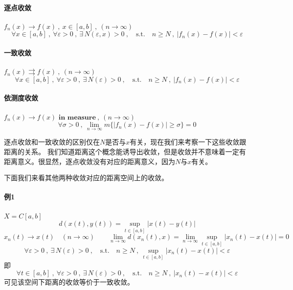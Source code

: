 \paragraph*{逐点收敛} \quad $f_n(x) \rightarrow f(x) \ , \ x \in [a,b] \ , \ (n \rightarrow \infty)$
\[\forall x \in [a,b] \ , \ \forall \varepsilon>0 \ , \ \exists \, N(\varepsilon,x)>0 \ , \quad \text{s.t.} \quad n \geq N \ , \ |f_n(x)-f(x)|<\varepsilon\]

\paragraph*{一致收敛} \quad $f_n(x) \rightrightarrows f(x) \ , \ (n \rightarrow \infty)$
\[\forall x \in [a,b] \ , \ \forall \varepsilon>0 \ , \ \exists \, N(\varepsilon)>0 \ , \quad \text{s.t.} \quad n \geq N \ , \ |f_n(x)-f(x)|<\varepsilon\]

\paragraph*{依测度收敛} \quad $f_n(x) \rightarrow f(x)\textbf{ in measure} \ , \ (n \rightarrow \infty)$
\[\forall \sigma>0 \ , \ \lim_{n \rightarrow \infty}m\{|f_n(x)-f(x)| \geq \sigma\}=0\]

逐点收敛和一致收敛的区别仅在$N$是否与$x$有关，现在我们来考察一下这些收敛跟距离的关系。
我们知道距离这个概念能诱导出收敛，但是收敛并不意味着一定有距离意义。很显然，逐点收敛没有对应的距离意义，因为$N$与$x$有关。

下面我们来看其他两种收敛对应的距离空间上的收敛。

\paragraph*{例1} \quad $X=C[a,b]$
\[d(x(t),y(t))=\mathop {\text{sup}}\limits_{t \in [a,b]}|x(t)-y(t)|\]
\[x_n(t) \rightarrow x(t) \quad (n \rightarrow \infty) \qquad \lim_{n \rightarrow \infty}d(x_n(t),x)=\lim_{n \rightarrow \infty}\mathop {\text{sup}}\limits_{t \in [a,b]}|x_n(t)-x(t)|=0\]
\[\forall \varepsilon>0 \ , \ \exists \, N(\varepsilon)>0 \ , \quad \text{s.t.} \quad n \geq N \ , \ \mathop {\text{sup}}\limits_{t \in [a,b]}|x_n(t)-x(t)|<\varepsilon\]
即
\[\forall t \in [a,b] \ , \ \forall \varepsilon>0 \ , \ \exists \, N(\varepsilon)>0 \ , \quad \text{s.t.} \quad n \geq N \ , \ |x_n(t)-x(t)|<\varepsilon\]
可见该空间下距离的收敛等价于一致收敛。

